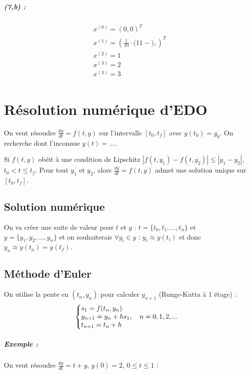 \documentclass[11pt,a4paper]{report}
\newcommand{\dydt}{\frac{dy}{dt}}
\begin{document}
\paragraph*{(7,b) : }
\begin{align*}
& x^{(0)} = (0,0)^T \\
& x^{(1)} = (\frac{1}{10} \cdot \Big( 11 -  \Big),)^T \\
& x^{(2)} =  1\\
& x^{(3)} =  2\\
& x^{(4)} =  3\\
\end{align*}

\chapter{Résolution numérique d'EDO}

On veut résoudre $\dydt=f(t,y)$ sur l'intervalle $[t_0,t_f]$ avec $y(t_0)=y_0$. On recherche dont l'inconnue $y(t)=...$.

Si $f(t,y)$ obéit à une condition de Lipschitz $|f(t,y_1)-f(t,y_2)| \leq |y_1-y_2|$, $t_0 < t \leq t_f$. Pour tout $y_1$ et $y_2$, alors $\dydt=f(t,y)$ admet une solution unique sur $[t_0,t_f]$.

\section{Solution numérique}

On va créer une suite de valeur pour $t$ et $y$ : $t=\{t_0,t_1,...,t_n\}$ et $y=\{y_1,y_2,...,y_n\}$ et on souhaiterais $\forall y_i \in y$ : $y_i \approx y(t_i)$ et donc $y_n \approx y(t_n) = y(t_f)$.

\section{Méthode d'Euler}

On utilise la pente en $(t_n,y_n)$ pour calculer $y_{n+1}$ (Runge-Kutta à 1 étage) :
$$
\left\{
\begin{array}{@{}l@{}}
    s_1 = f(t_n,y_n) \\
    y_{n+1} = y_n + hs_1, \ \ \ n = 0,1,2,... \\
    t_{n+1} = t_n + h
\end{array}\right.
$$ 

\paragraph*{Exemple : } On veut résoudre $\dydt=t+y$, $y(0)=2$, $0\leq t \leq 1$ :
\end{document}
